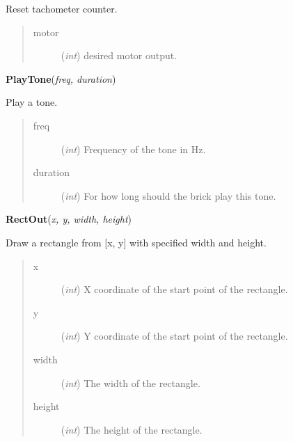 \documentclass[10pt,a4paper]{article}
\begin{document}
    Reset tachometer counter. 


    

\begin{quote}
    \begin{description}
        
\item[motor] ({\emph{int}}) desired motor output.

    \end{description}
\end{quote}

 

\vspace{6pt}
{\bf PlayTone}({\it freq, duration}) 
    
    Play a tone.



    

\begin{quote}
    \begin{description}
        
\item[freq] ({\emph{int}}) Frequency of the tone in Hz.

\item[duration] ({\emph{int}}) For how long should the brick play this tone. 

    \end{description}
\end{quote}

 

\vspace{6pt}
{\bf RectOut}({\it x, y, width, height}) 
    
    Draw a rectangle from [x, y] with specified width and height.





    
    

\begin{quote}
    \begin{description}
        
\item[x] ({\emph{int}}) X coordinate of the start point of the rectangle.

\item[y] ({\emph{int}}) Y coordinate of the start point of the rectangle.

\item[width] ({\emph{int}}) The width of the rectangle.

\item[height] ({\emph{int}}) The height of the rectangle.

    \end{description}
\end{quote}
\end{document}
